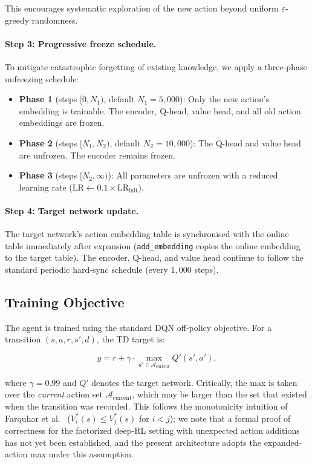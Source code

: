 \documentclass{article}
\begin{document}
This encourages systematic exploration of the new action beyond uniform
$\varepsilon$-greedy randomness.

\paragraph{Step 3: Progressive freeze schedule.}
To mitigate catastrophic forgetting of existing knowledge, we apply a three-phase
unfreezing schedule:

\begin{itemize}[nosep]
  \item \textbf{Phase 1} (steps $[0, N_1)$, default $N_1=5{,}000$): Only the
  new action's embedding is trainable. The encoder, Q-head, value head, and
  all old action embeddings are frozen.
  \item \textbf{Phase 2} (steps $[N_1, N_2)$, default $N_2=10{,}000$): The
  Q-head and value head are unfrozen. The encoder remains frozen.
  \item \textbf{Phase 3} (steps $[N_2, \infty)$): All parameters are unfrozen
  with a reduced learning rate ($\text{LR} \leftarrow 0.1 \times
  \text{LR}_\text{init}$).
\end{itemize}

\paragraph{Step 4: Target network update.}
The target network's action embedding table is synchronised with the online
table immediately after expansion (\texttt{add\_embedding} copies the online
embedding to the target table). The encoder, Q-head, and value head continue to
follow the standard periodic hard-sync schedule (every $1{,}000$ steps).

\subsection{Training Objective}

The agent is trained using the standard DQN off-policy objective. For a
transition $(s, a, r, s', d)$, the TD target is:

\begin{equation}
y = r + \gamma \cdot \max_{a' \in \mathcal{A}_\text{current}} Q'(s', a'),
\label{eq:td_target}
\end{equation}

where $\gamma=0.99$ and $Q'$ denotes the target network. Critically, the max
is taken over the \emph{current} action set $\mathcal{A}_\text{current}$, which
may be larger than the set that existed when the transition was recorded. This
follows the monotonicity intuition of Farquhar
et al.~\cite{farquhar2020growing} ($V^*_i(s) \leq V^*_j(s)$ for $i < j$); we
note that a formal proof of correctness for the factorized deep-RL setting with
unexpected action additions has not yet been established, and the present
architecture adopts the expanded-action max under this assumption.
\end{document}

